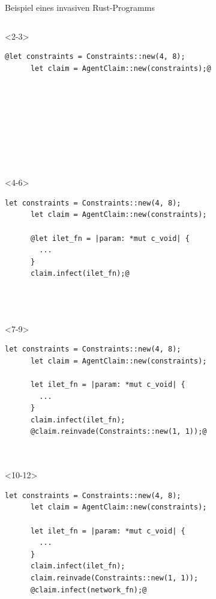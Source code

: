 \begin{frame}[fragile]{Beispiel eines invasiven Rust-Programms}
\begin{onlyenv}
\begin{lstlisting}[frame=single,style=base]
    \end{lstlisting}
  \end{onlyenv}

  \begin{onlyenv}<2-3>
    \begin{lstlisting}[frame=single,style=base]
      @let constraints = Constraints::new(4, 8);
      let claim = AgentClaim::new(constraints);@









      \end{lstlisting}
  \end{onlyenv}

  \begin{onlyenv}<4-6>
    \begin{lstlisting}[frame=single,style=base]
      let constraints = Constraints::new(4, 8);
      let claim = AgentClaim::new(constraints);

      @let ilet_fn = |param: *mut c_void| {
        ...
      }
      claim.infect(ilet_fn);@




      \end{lstlisting}
  \end{onlyenv}

  \begin{onlyenv}<7-9>
    \begin{lstlisting}[frame=single,style=base]
      let constraints = Constraints::new(4, 8);
      let claim = AgentClaim::new(constraints);

      let ilet_fn = |param: *mut c_void| {
        ...
      }
      claim.infect(ilet_fn);
      @claim.reinvade(Constraints::new(1, 1));@



      \end{lstlisting}
  \end{onlyenv}

  \begin{onlyenv}<10-12>
    \begin{lstlisting}[frame=single,style=base]
      let constraints = Constraints::new(4, 8);
      let claim = AgentClaim::new(constraints);

      let ilet_fn = |param: *mut c_void| {
        ...
      }
      claim.infect(ilet_fn);
      claim.reinvade(Constraints::new(1, 1));
      @claim.infect(network_fn);@


      \end{lstlisting}
  \end{onlyenv}


\end{frame}
